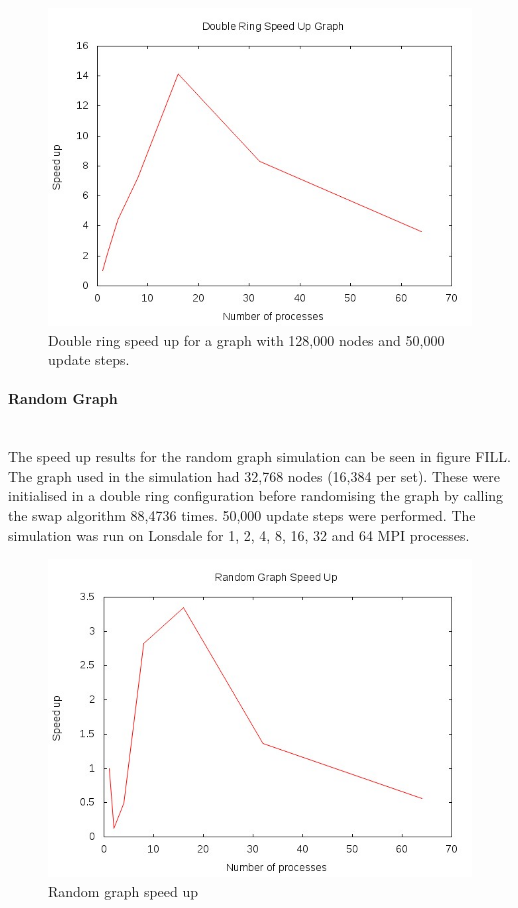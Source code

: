 \documentclass[pdftex,12pt,a4paper]{article}
\begin{document}
\begin{figure}
\centering
\includegraphics[scale=0.8]{d_r_speed.jpg}
\caption{Double ring speed up for a graph with 128,000 nodes and 50,000 update steps.}
\end{figure}


\paragraph{Random Graph} ~\\

The speed up results for the random graph simulation can be seen in figure FILL. The graph used in the simulation had 32,768 nodes (16,384 per set). These were initialised in a double ring configuration before randomising the graph by calling the swap algorithm 88,4736 times. 50,000 update steps were performed. The simulation was run on Lonsdale for 1, 2, 4, 8, 16, 32 and 64 MPI processes. 

\begin{figure}
\centering
\includegraphics[scale=0.8]{rand_speed.jpg}
\caption{Random graph speed up}
\end{figure}
\end{document}
